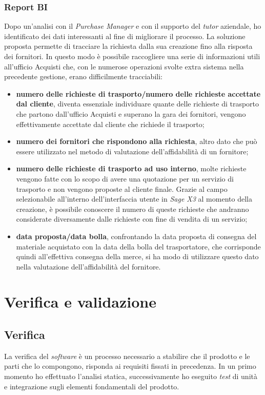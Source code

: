 \subsubsection{Report BI}
Dopo un'analisi con il \textit{Purchase Manager} e con il supporto del \textit{tutor} aziendale, ho identificato dei dati interessanti al fine di migliorare il processo.
La soluzione proposta permette di tracciare la richiesta dalla sua creazione fino alla risposta dei fornitori. In questo modo è possibile raccogliere una serie di informazioni utili all'ufficio Acquisti che, con le numerose operazioni svolte extra sistema nella precedente gestione, erano difficilmente tracciabili:
\begin{itemize}
	\item \textbf{numero delle richieste di trasporto/numero delle richieste accettate dal cliente}, diventa essenziale individuare quante delle richieste di trasporto che partono dall'ufficio Acquisti e superano la gara dei fornitori, vengono effettivamente accettate dal cliente che richiede il trasporto;
	\item \textbf{numero dei fornitori che rispondono alla richiesta}, altro dato che può essere utilizzato nel metodo di valutazione dell'affidabilità di un fornitore;
	\item \textbf{numero delle richieste di trasporto ad uso interno}, molte richieste vengono fatte con lo scopo di avere una quotazione per un servizio di trasporto e non vengono proposte al cliente finale. Grazie al campo selezionabile all'interno dell'interfaccia utente in \textit{Sage X3}  al momento della creazione, è possibile conoscere il numero di queste richieste che andranno considerate diversamente dalle richieste con fine di vendita di un servizio;
	\item \textbf{data proposta/data bolla}, confrontando la data proposta di consegna del materiale acquistato con la data della bolla del trasportatore, che corrisponde quindi all'effettiva consegna della merce, si ha modo di utilizzare questo dato nella valutazione dell'affidabilità del fornitore.
\end{itemize}





\section{Verifica e validazione}

\subsection{Verifica}
\label{cap:test}
La verifica del \textit{software} è un processo necessario a stabilire che il prodotto e le parti che lo compongono, risponda ai requisiti fissati in precedenza.
In un primo momento ho effettuato l'analisi statica, successivamente ho eseguito \textit{test} di unità e integrazione sugli elementi fondamentali del prodotto.


